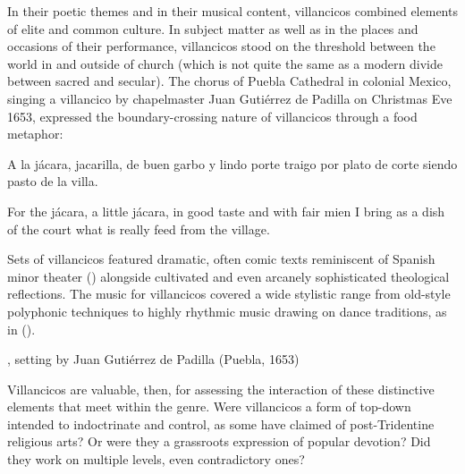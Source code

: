 In their poetic themes and in their musical content, villancicos combined elements of elite and common culture. 
In subject matter as well as in the places and occasions of their performance, villancicos stood on the threshold between the world in and outside of church (which is not quite the same as a modern divide between sacred and secular). 
The chorus of Puebla Cathedral in colonial Mexico, singing a villancico by chapelmaster Juan Gutiérrez de Padilla on Christmas Eve 1653, expressed the boundary-crossing nature of villancicos through a food metaphor:
%
\begin{poemtranslation}
\begin{original}
A la jácara, jacarilla,
de buen garbo y lindo porte
traigo por plato de corte
siendo pasto de la villa.
\end{original}
\begin{translation}
For the jácara, a little jácara,
in good taste and with fair mien
I bring as a dish of the court
what is really feed from the village.
\end{translation}
\end{poemtranslation}
%
Sets of villancicos featured dramatic, often comic texts reminiscent of Spanish minor theater () alongside cultivated and even arcanely sophisticated theological reflections.
The music for villancicos covered a wide stylistic range from old-style polyphonic techniques to highly rhythmic music drawing on dance traditions, as in  ().

\begin{musicexample}
\caption{, setting by Juan Gutiérrez de Padilla (Puebla, 1653)}
\label{mus:Padilla-A_la_jacara_jacarilla}
\end{musicexample}

Villancicos are valuable, then, for assessing the interaction of these distinctive elements that meet within the genre.
Were villancicos a form of top-down  intended to indoctrinate and control, as some have claimed of post-Tridentine religious arts?
Or were they a grassroots expression of popular devotion? 
Did they work on multiple levels, even contradictory ones?

